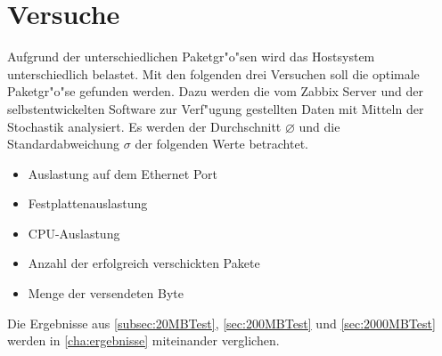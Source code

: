 \chapter{Versuche}
\label{cha:versuche}
Aufgrund der unterschiedlichen Paketgr"o"sen wird das Hostsystem unterschiedlich belastet. Mit den %
folgenden drei Versuchen soll die optimale Paketgr"o"se gefunden werden. %
Dazu werden die vom Zabbix Server und der selbstentwickelten Software zur Verf"ugung gestellten %
Daten mit Mitteln der Stochastik analysiert. Es werden der Durchschnitt $\diameter $ und die Standardabweichung $\sigma $
der folgenden Werte betrachtet. %
\begin{itemize}
\item Auslastung auf dem Ethernet Port
\item Festplattenauslastung
\item CPU-Auslastung 
\item Anzahl der erfolgreich verschickten Pakete
\item Menge der versendeten Byte
\end{itemize}

Die Ergebnisse aus \cref{subsec:20MBTest}, \cref{sec:200MBTest} und \cref{sec:2000MBTest} werden %
in \cref{cha:ergebnisse} miteinander verglichen. %





